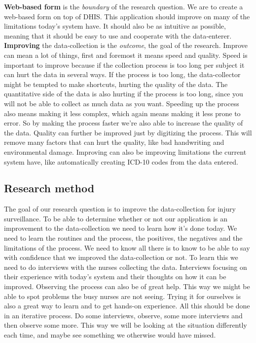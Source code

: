 \documentclass[UKenglish, 12pt]{article}
\newcommand{\is}{injury surveillance}
\begin{document}
\textbf{Web-based form} is the \textit{boundary} of the research question. We are to
create a web-based form on top of DHIS. This application should improve on many
of the limitations today's system have. It should also be as intuitive as
possible, meaning that it should be easy to use and cooperate with the
data-enterer.\\

\textbf{Improving} the data-collection is the \textit{outcome}, the goal of the
research. Improve can mean a lot of things, first and foremost it means speed
and quality. Speed is important to improve because if the collection process is
too long per subject it can hurt the data in several ways. If the process is too
long, the data-collector might be tempted to make shortcuts, hurting the quality
of the data. The quantitative side of the data is also hurting if the process
is too long, since you will not be able to collect as much data as you want.
Speeding up the process also means making it less complex, which again means
making it less prone to error. So by making the process faster we're also able
to increase the quality of the data.  Quality can further be improved just by
digitizing the process. This will remove many factors that can hurt the quality,
like bad handwriting and environmental damage.
Improving can also be improving limitations the current system have, like
automatically creating ICD-10 codes from the data entered.\\

\subsection*{Research method} %
The goal of our research question is to improve the data-collection for \is. To
be able to determine whether or not our application is an improvement to the
data-collection we need to learn how it's done today. We need to learn the
routines and the process, the positives, the negatives and the limitations of
the process. We need to know all there is to know to be able to say with
confidence that we improved the data-collection or not. To learn this we need to
do interviews with the nurses collecting the data. Interviews focusing on their
experience with today's system and their thoughts on how it can be improved.
Observing the process can also be of great help. This way we might be able
to spot problems the busy nurses are not seeing.  Trying it for ourselves is
also a great way to learn and to get hands-on experience. All this should be
done in an iterative process. Do some interviews, observe, some more
interviews and then observe some more. This way we will be looking at the
situation differently each time, and maybe see something we otherwise would
have missed.\\
\end{document}
